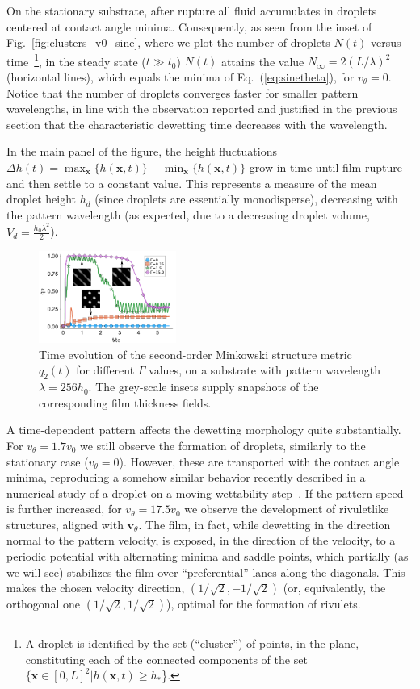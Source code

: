 On the stationary substrate, after rupture all fluid accumulates in droplets centered at contact angle minima.
Consequently, as seen from the inset of Fig.~\ref{fig:clusters_v0_sine}, where we plot the number of droplets $N(t)$ versus time~\footnote{A droplet is identified by the set (``cluster'') of points, in the plane, constituting each of the connected components of the set $\{\mathbf{x} \in [0,L]^2 | h(\mathbf{x},t) \geq h_{\ast}$\}.}, in the steady state ($t \gg t_0$) $N(t)$ attains the value $N_{\infty} = 2(L/\lambda)^2$ (horizontal lines), which equals the minima of Eq.~(\ref{eq:sinetheta}), for $v_{\theta}=0$.
Notice that the number of droplets converges faster for smaller pattern wavelengths, in line with the observation reported and justified in the previous section that the characteristic dewetting time decreases with the wavelength.

In the main panel of the figure, the height fluctuations $\Delta h(t) = \max_{\mathbf{x}}\{h(\mathbf{x},t)\}-\min_{\mathbf{x}}\{h(\mathbf{x},t)\}$ grow in time until film rupture and then settle to a constant value. 
This represents a measure of the mean droplet height $h_d$ (since droplets are essentially monodisperse), decreasing with the pattern wavelength (as expected, due to a decreasing droplet volume, $V_d = \frac{h_0 \lambda^2}{2}$).
\begin{figure}
    \centering
    \includegraphics[width=0.4\textwidth]{graphics/Figure_4.pdf}
    \caption{Time evolution of the second-order Minkowski structure metric $q_2(t)$ for different $\Gamma$ values, on a substrate with pattern wavelength $\lambda=256 h_0$.
    The grey-scale insets supply snapshots of the corresponding film thickness fields.}
    \label{fig:msm_q2}
\end{figure}

A time-dependent pattern affects the dewetting morphology quite substantially.
For $v_{\theta} = 1.7 v_0$ we still observe the formation of droplets, similarly to the stationary case ($v_{\theta} = 0$). 
However, these are transported with the contact angle minima, reproducing a somehow similar behavior recently described in a numerical study of a droplet on a moving wettability step~\cite{grawitterSteeringDropletsSubstrates2021}.
If the pattern speed is further increased, for $v_{\theta} = 17.5 v_0$ we observe the development of rivuletlike structures, aligned with $\mathbf{v}_{\theta}$. 
The film, in fact, while dewetting in the direction normal to the pattern velocity, is exposed, in the direction of the velocity, to a periodic potential with alternating minima and saddle points, which partially (as we will see) stabilizes the film over ``preferential'' lanes along the diagonals. 
This makes the chosen velocity direction, $(1/\sqrt{2},-1/\sqrt{2})$ (or, equivalently, the orthogonal one $(1/\sqrt{2},1/\sqrt{2})$), optimal for the formation of rivulets. 

